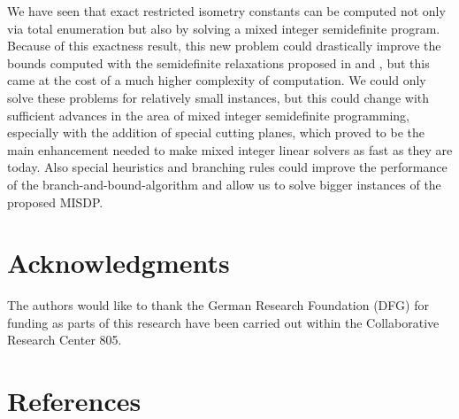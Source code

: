 \documentclass[a4paper,11pt,1p]{elsarticle}
\begin{document}
We have seen that exact restricted isometry constants can be computed not only via total enumeration but also by solving a mixed integer semidefinite program. Because of this exactness result, this new problem could drastically
improve the bounds computed with the semidefinite relaxations proposed in \cite{Asp07} and \cite{Asp08}, but this came at the cost of a much higher complexity of computation. We could only solve these problems for relatively small
instances, but this could change with sufficient advances in the area of mixed integer semidefinite programming, especially with the addition of special cutting planes, which proved to be the main enhancement needed to make mixed
integer linear solvers as fast as they are today. Also special heuristics and branching rules could improve the performance of the branch-and-bound-algorithm and allow us to solve bigger instances of the proposed MISDP.

\section*{Acknowledgments}
The authors would like to thank the German Research Foundation (DFG) for funding as parts of this research have been carried out within the Collaborative Research Center 805.

\section*{References}


\end{document}
